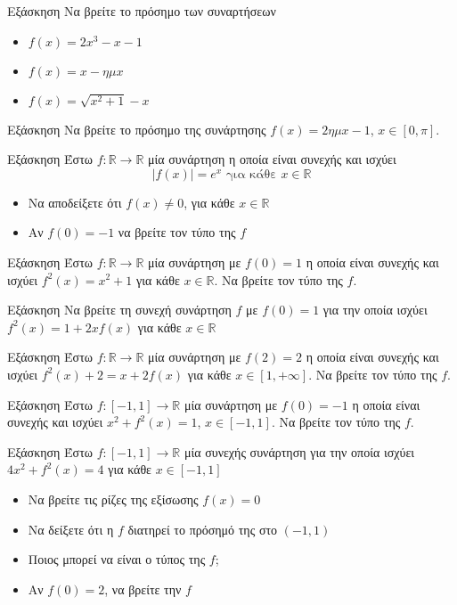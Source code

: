 \documentclass[greek]{beamer}
\begin{document}
\begin{frame}{Εξάσκηση}
 Να βρείτε το πρόσημο των συναρτήσεων
 \begin{itemize}
  \item $f(x)=2x^3-x-1$
  \item $f(x)=x-ημx$
  \item $f(x)=\sqrt{x^2+1}-x$
 \end{itemize}
\end{frame}

\begin{frame}{Εξάσκηση}
 Να βρείτε το πρόσημο της συνάρτησης $f(x)=2ημx-1$, $x\in [0,π]$.
\end{frame}

\begin{frame}{Εξάσκηση}
 Έστω $f:\mathbb{R}\to\mathbb{R}$ μία συνάρτηση η οποία είναι συνεχής και ισχύει
 $$|f(x)|=e^x \text{ για κάθε } x\in\mathbb{R}$$
 \begin{itemize}
  \item Να αποδείξετε ότι $f(x)\ne 0$, για κάθε $x\in\mathbb{R}$
  \item Αν $f(0)=-1$ να βρείτε τον τύπο της $f$
 \end{itemize}
\end{frame}

\begin{frame}{Εξάσκηση}
 Έστω $f:\mathbb{R}\to\mathbb{R}$ μία συνάρτηση με $f(0)=1$ η οποία είναι συνεχής και ισχύει $f^2(x)=x^2+1$ για κάθε $x\in\mathbb{R}$. Να βρείτε τον τύπο της $f$.
\end{frame}

\begin{frame}{Εξάσκηση}
 Να βρείτε τη συνεχή συνάρτηση $f$ με $f(0)=1$ για την οποία ισχύει $f^2(x)=1+2xf(x)$ για κάθε $x\in\mathbb{R}$
\end{frame}

\begin{frame}{Εξάσκηση}
 Έστω $f:\mathbb{R}\to\mathbb{R}$ μία συνάρτηση με $f(2)=2$ η οποία είναι συνεχής και ισχύει $f^2(x)+2=x+2f(x)$ για κάθε $x\in [1,+\infty]$. Να βρείτε τον τύπο της $f$.
\end{frame}

\begin{frame}{Εξάσκηση}
 Έστω $f:[-1,1]\to\mathbb{R}$ μία συνάρτηση με $f(0)=-1$ η οποία είναι συνεχής και ισχύει $x^2+f^2(x)=1$, $x\in [-1,1]$. Να βρείτε τον τύπο της $f$.
\end{frame}

\begin{frame}{Εξάσκηση}
 Έστω $f:[-1,1]\to\mathbb{R}$ μία συνεχής συνάρτηση για την οποία ισχύει $4x^2+f^2(x)=4$ για κάθε $x\in [-1,1]$
 \begin{itemize}
   \item Να βρείτε τις ρίζες της εξίσωσης $f(x)=0$
   \item Να δείξετε ότι η $f$ διατηρεί το πρόσημό της στο $(-1,1)$
   \item Ποιος μπορεί να είναι ο τύπος της $f$;
   \item Αν $f(0)=2$, να βρείτε την $f$
 \end{itemize}
\end{frame}
\end{document}
